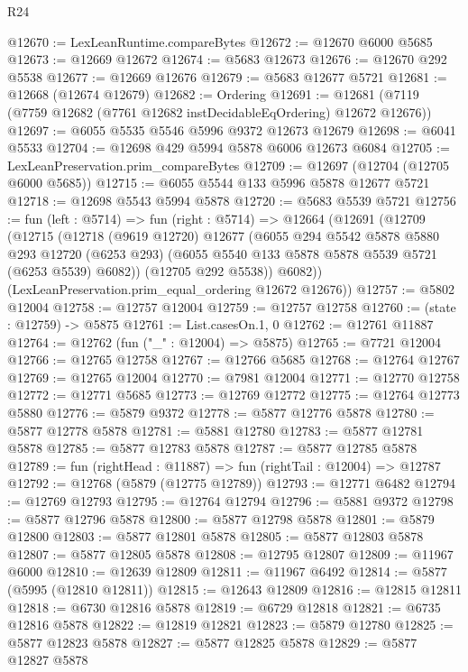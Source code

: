 \begin{lexlean}{R24}
\begin{coremodule}
@12670 := LexLeanRuntime.compareBytes
@12672 := @12670 @6000 @5685
@12673 := @12669 @12672
@12674 := @5683 @12673
@12676 := @12670 @292 @5538
@12677 := @12669 @12676
@12679 := @5683 @12677 @5721
@12681 := @12668 (@12674 @12679)
@12682 := Ordering
@12691 := @12681 (@7119 (@7759 @12682 (@7761 @12682 instDecidableEqOrdering) @12672 @12676))
@12697 := @6055 @5535 @5546 @5996 @9372 @12673 @12679
@12698 := @6041 @5533
@12704 := @12698 @429 @5994 @5878 @6006 @12673 @6084
@12705 := LexLeanPreservation.prim_compareBytes
@12709 := @12697 (@12704 (@12705 @6000 @5685))
@12715 := @6055 @5544 @133 @5996 @5878 @12677 @5721
@12718 := @12698 @5543 @5994 @5878
@12720 := @5683 @5539 @5721
@12756 := fun (left : @5714) =>
  fun (right : @5714) =>
  @12664
    (@12691
      (@12709
        (@12715
          (@12718
            (@9619 @12720)
            @12677
            (@6055
              @294
              @5542
              @5878
              @5880
              @293
              @12720
              (@6253 @293)
              (@6055 @5540 @133 @5878 @5878 @5539 @5721 (@6253 @5539) @6082))
            (@12705 @292 @5538))
          @6082))
      (LexLeanPreservation.prim_equal_ordering @12672 @12676))
@12757 := @5802 @12004
@12758 := @12757 @12004
@12759 := @12757 @12758
@12760 := (state : @12759) -> @5875
@12761 := List.casesOn.{1, 0}
@12762 := @12761 @11887
@12764 := @12762 (fun ("_" : @12004) => @5875)
@12765 := @7721 @12004
@12766 := @12765 @12758
@12767 := @12766 @5685
@12768 := @12764 @12767
@12769 := @12765 @12004
@12770 := @7981 @12004
@12771 := @12770 @12758
@12772 := @12771 @5685
@12773 := @12769 @12772
@12775 := @12764 @12773 @5880
@12776 := @5879 @9372
@12778 := @5877 @12776 @5878
@12780 := @5877 @12778 @5878
@12781 := @5881 @12780
@12783 := @5877 @12781 @5878
@12785 := @5877 @12783 @5878
@12787 := @5877 @12785 @5878
@12789 := fun (rightHead : @11887) => fun (rightTail : @12004) => @12787
@12792 := @12768 (@5879 (@12775 @12789))
@12793 := @12771 @6482
@12794 := @12769 @12793
@12795 := @12764 @12794
@12796 := @5881 @9372
@12798 := @5877 @12796 @5878
@12800 := @5877 @12798 @5878
@12801 := @5879 @12800
@12803 := @5877 @12801 @5878
@12805 := @5877 @12803 @5878
@12807 := @5877 @12805 @5878
@12808 := @12795 @12807
@12809 := @11967 @6000
@12810 := @12639 @12809
@12811 := @11967 @6492
@12814 := @5877 (@5995 (@12810 @12811))
@12815 := @12643 @12809
@12816 := @12815 @12811
@12818 := @6730 @12816 @5878
@12819 := @6729 @12818
@12821 := @6735 @12816 @5878
@12822 := @12819 @12821
@12823 := @5879 @12780
@12825 := @5877 @12823 @5878
@12827 := @5877 @12825 @5878
@12829 := @5877 @12827 @5878

\end{coremodule}
\end{lexlean}
